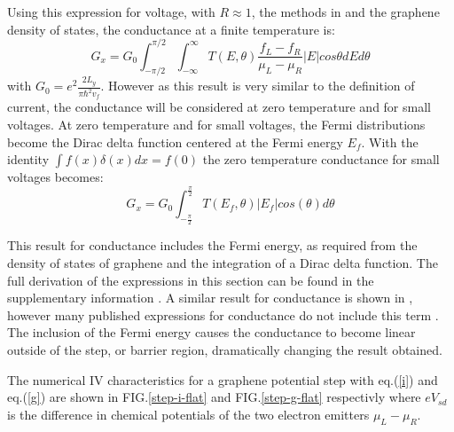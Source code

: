 \documentclass[prl,twocolumn,aps,superscriptaddress,floatfix,10pt]{revtex4}
\begin{document}
	Using this expression for voltage, with $R \approx 1$,  the methods in \cite{b8} and the graphene density of states, the conductance at a finite temperature is:
\begin{equation}
	G_{x}=G_{0}\int^{\pi/2}_{-\pi/2} \int^{\infty}_{-\infty} T\left(E,\theta\right)\frac{f_{L}-f_{R}}{\mu_{L}-\mu_{R}}|E|cos\theta dE d\theta
\end{equation}
with $G_{0}=e^{2}\frac{2L_{y}}{\pi\hbar^{2}v_{f}}$. However as this result is very similar to the definition of current, the conductance will be considered at zero temperature and for small voltages. At zero temperature and for small voltages, the Fermi distributions become the Dirac delta function centered at the Fermi energy $E_{f}$. With the identity $\int f(x)\delta(x) dx=f(0)$ the zero temperature conductance for small voltages becomes:
\begin{equation}
	G_{x}= G_{0}\int^{\frac{\pi}{2}}_{-\frac{\pi}{2}} T\left(E_{f},\theta\right)|E_{f}|cos\left(\theta\right)d\theta
	\label{g}
\end{equation}

	This result for conductance includes the Fermi energy, as required from the density of states of graphene and the integration of a Dirac delta function. The full derivation of the expressions in this section can be found in the supplementary information \cite{b17}. A similar result for conductance is shown in \cite{b6,b19}, however many published expressions for conductance do not include this term \cite{b2,b4,b10}. The inclusion of the Fermi energy causes the conductance to become linear outside of the step, or barrier region, dramatically changing the result obtained.

	The numerical IV characteristics for a graphene potential step with eq.(\ref{i}) and eq.(\ref{g}) are shown in FIG.\ref{step-i-flat} and FIG.\ref{step-g-flat} respectivly where $eV_{sd}$ is the difference in chemical potentials of the two electron emitters $\mu_{L}-\mu_{R}$. 
\end{document}
